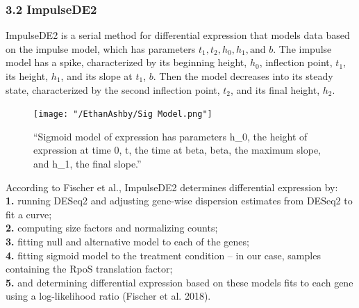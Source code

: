 \documentclass[]{article}
\begin{document}
\subsubsection{\texorpdfstring{\textbf{3.2}
ImpulseDE2}{3.2 ImpulseDE2}}\label{impulsede2}

ImpulseDE2 is a serial method for differential expression that models
data based on the impulse model, which has parameters
\(t_1, t_2, h_0, h_1, \text{and } b.\) The impulse model has a spike,
characterized by its beginning height, \(h_0\), inflection point,
\(t_1\), its height, \(h_1\), and its slope at \(t_1\), \(b\). Then the
model decreases into its steady state, characterized by the second
inflection point, \(t_2\), and its final height, \(h_2\).

\begin{figure}
\centering
\texttt{[image: "/EthanAshby/Sig Model.png"]}
\caption{``Sigmoid model of expression has parameters h\_0, the height
of expression at time 0, t, the time at beta, beta, the maximum slope,
and h\_1, the final slope.''}
\end{figure}

According to Fischer et al., ImpulseDE2 determines differential
expression by:\\
\textbf{1.} running DESeq2 and adjusting gene-wise dispersion estimates
from DESeq2 to fit a curve;\\
\textbf{2.} computing size factors and normalizing counts;\\
\textbf{3.} fitting null and alternative model to each of the genes;\\
\textbf{4.} fitting sigmoid model to the treatment condition -- in our
case, samples containing the RpoS translation factor;\\
\textbf{5.} and determining differential expression based on these
models fits to each gene using a log-likelihood ratio (Fischer et al.
2018).
\end{document}
